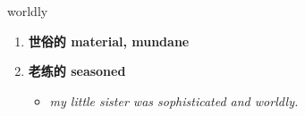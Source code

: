 
\begin{frame}
{\huge worldly}
\begin{center}
\begin{enumerate}\Large
  \item \textbf{世俗的 material, mundane}
  \item \textbf{老练的 seasoned}
  \begin{itemize}
    \item \em{\Large{my little sister was sophisticated and worldly.}}
  \end{itemize}
\end{enumerate}
\end{center}
\end{frame}
